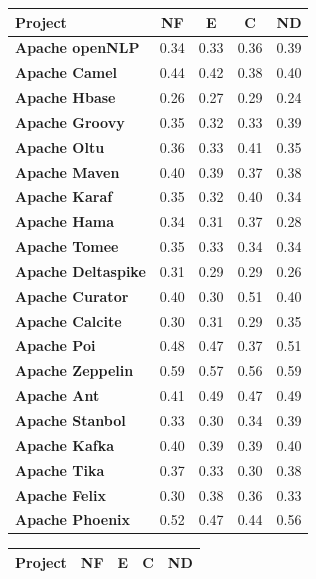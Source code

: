 {\begin{landscape}
\begin{table}[!htbp]
		
		
		\begin{tabular}{l|c|c|c|c}
			\hline
			\textbf{Project}   & {\bf NF}    & {\bf E} & {\bf C} & {\bf ND}    \\ \hline
			\textbf{Apache openNLP} & 0.34 & 0.33 & 0.36 & 0.39\\ \hline
			\textbf{Apache Camel} & 0.44 & 0.42 & 0.38 & 0.40
\\ \hline
			\textbf{Apache Hbase} & 0.26 & 0.27 & 0.29 & 0.24
\\ \hline
			\textbf{Apache Groovy} & 0.35 & 0.32 & 0.33 & 0.39
\\ \hline
			\textbf{Apache Oltu} & 0.36 & 0.33 & 0.41 & 0.35\\ \hline
			\textbf{Apache Maven} & 0.40 & 0.39 & 0.37 & 0.38
\\ \hline
			\textbf{Apache Karaf} & 0.35 & 0.32 & 0.40 & 0.34
\\ \hline
			\textbf{Apache Hama} & 0.34 & 0.31 & 0.37 & 0.28
\\ \hline
			\textbf{Apache Tomee} & 0.35 & 0.33 & 0.34 & 0.34
\\ \hline
			\textbf{Apache Deltaspike} & 0.31 & 0.29 & 0.29 & 0.26
\\ \hline
			\textbf{Apache Curator} & 0.40 & 0.30 & 0.51 & 0.40
\\ \hline
			\textbf{Apache Calcite} & 0.30 & 0.31 & 0.29 & 0.35
\\ \hline
			\textbf{Apache Poi} & 0.48 & 0.47 & 0.37 & 0.51\\ \hline
			\textbf{Apache Zeppelin} & 0.59 & 0.57 & 0.56 & 0.59
\\ \hline
			\textbf{Apache Ant} & 0.41 & 0.49 & 0.47 & 0.49
\\ \hline
			\textbf{Apache Stanbol} & 0.33 & 0.30 & 0.34 & 0.39
\\ \hline
			\textbf{Apache Kafka} & 0.40 & 0.39 & 0.39 & 0.40
\\ \hline
			\textbf{Apache Tika} & 0.37 & 0.33 & 0.30 & 0.38\\ \hline
			\textbf{Apache Felix} & 0.30 & 0.38 & 0.36 & 0.33
\\ \hline
			\textbf{Apache Phoenix} & 0.52 & 0.47 & 0.44 & 0.56\\ \hline
		\end{tabular}
		\quad \quad \quad 
		\begin{tabular}{l|c|c|c|c}
			\hline
			\textbf{Project}   & {\bf NF}    & {\bf E} & {\bf C} & {\bf ND}    \\ \hline
			

\end{tabular}
\end{table}
\end{landscape}}
